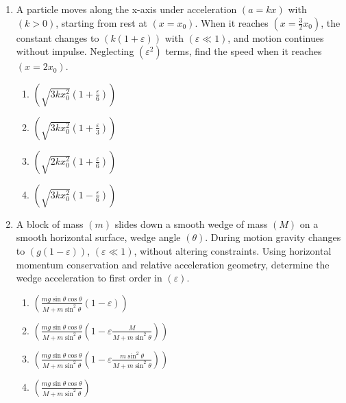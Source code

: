 \documentclass[12pt]{article}
\begin{document}
\begin{enumerate}

\item A particle moves along the x-axis under acceleration $(a = kx)$ with $(k>0)$, starting from rest at $(x=x_0)$. When it reaches $(x=\frac{3}{2}x_0)$, the constant changes to $(k(1+\varepsilon))$ with $(\varepsilon\ll1)$, and motion continues without impulse. Neglecting $(\varepsilon^2)$ terms, find the speed when it reaches $(x=2x_0)$.

\begin{enumerate}[label=\Alph*)]
\item $(\sqrt{3k x_0^2}\left(1+\frac{\varepsilon}{6}\right))$
\item $(\sqrt{3k x_0^2}\left(1+\frac{\varepsilon}{3}\right))$
\item $(\sqrt{2k x_0^2}\left(1+\frac{\varepsilon}{6}\right))$
\item $(\sqrt{3k x_0^2}\left(1-\frac{\varepsilon}{6}\right))$
\end{enumerate}

\item A block of mass $(m)$ slides down a smooth wedge of mass $(M)$ on a smooth horizontal surface, wedge angle $(\theta)$. During motion gravity changes to $(g(1-\varepsilon))$, $(\varepsilon\ll1)$, without altering constraints. Using horizontal momentum conservation and relative acceleration geometry, determine the wedge acceleration to first order in $(\varepsilon)$.



\begin{center}
\end{center}


\begin{enumerate}[label=\Alph*)]
\item $\left(\frac{mg\sin\theta\cos\theta}{M+m\sin^2\theta}(1-\varepsilon)\right)$
\item $\left(\frac{mg\sin\theta\cos\theta}{M+m\sin^2\theta}\left(1-\varepsilon\frac{M}{M+m\sin^2\theta}\right)\right)$
\item $\left(\frac{mg\sin\theta\cos\theta}{M+m\sin^2\theta}\left(1-\varepsilon\frac{m\sin^2\theta}{M+m\sin^2\theta}\right)\right)$
\item $\left(\frac{mg\sin\theta\cos\theta}{M+m\sin^2\theta}\right)$
\end{enumerate}


\end{enumerate}
\end{document}
